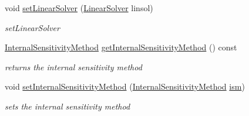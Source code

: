 \begin{DoxyCompactItemize}
void \mbox{\hyperlink{classamici_1_1_solver_acc8ecf11ad5a8480dd02f757faa264b2}{set\+Linear\+Solver}} (\mbox{\hyperlink{namespaceamici_a1a6a4776314a0843143e5631c3ce21a7}{Linear\+Solver}} linsol)
\begin{DoxyCompactList}\small\item\em set\+Linear\+Solver \end{DoxyCompactList}\item 
\mbox{\hyperlink{namespaceamici_aa444c52f0a5638d68702d1ec92f8db87}{Internal\+Sensitivity\+Method}} \mbox{\hyperlink{classamici_1_1_solver_a256c45c84346e83402b665493e04e65e}{get\+Internal\+Sensitivity\+Method}} () const
\begin{DoxyCompactList}\small\item\em returns the internal sensitivity method \end{DoxyCompactList}\item 
void \mbox{\hyperlink{classamici_1_1_solver_ab114a079f23232a521ad2e81a0a30e36}{set\+Internal\+Sensitivity\+Method}} (\mbox{\hyperlink{namespaceamici_aa444c52f0a5638d68702d1ec92f8db87}{Internal\+Sensitivity\+Method}} \mbox{\hyperlink{classamici_1_1_solver_a5b3b5ca18d3932765358bdf278290861}{ism}})
\begin{DoxyCompactList}\small\item\em sets the internal sensitivity method \end{DoxyCompactList}\end{DoxyCompactItemize}

